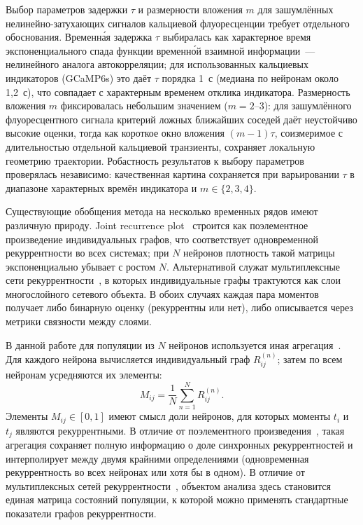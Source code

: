 Выбор параметров задержки $\tau$ и размерности вложения $m$ для зашумлённых нелинейно-затухающих сигналов кальциевой флуоресценции требует отдельного обоснования. Временна́я задержка $\tau$ выбиралась как характерное время экспоненциального спада функции временно́й взаимной информации~--- нелинейного аналога автокорреляции; для использованных кальциевых индикаторов (GCaMP6s) это даёт $\tau$ порядка 1~с (медиана по нейронам около 1,2~с), что совпадает с характерным временем отклика индикатора. Размерность вложения $m$ фиксировалась небольшим значением ($m = 2$--$3$): для зашумлённого флуоресцентного сигнала критерий ложных ближайших соседей даёт неустойчиво высокие оценки, тогда как короткое окно вложения $(m-1)\tau$, соизмеримое с длительностью отдельной кальциевой транзиенты, сохраняет локальную геометрию траектории. Робастность результатов к выбору параметров проверялась независимо: качественная картина сохраняется при варьировании $\tau$ в диапазоне характерных времён индикатора и $m \in \{2, 3, 4\}$.

Существующие обобщения метода на несколько временных рядов имеют различную природу. Joint recurrence plot~\cite{Romano2004} строится как поэлементное произведение индивидуальных графов, что соответствует одновременной рекуррентности во всех системах; при $N$ нейронов плотность такой матрицы экспоненциально убывает с ростом $N$. Альтернативой служат мультиплексные сети рекуррентности~\cite{Eroglu2018}, в которых индивидуальные графы трактуются как слои многослойного сетевого объекта. В обоих случаях каждая пара моментов получает либо бинарную оценку (рекуррентны или нет), либо описывается через метрики связности между слоями.

В данной работе для популяции из $N$ нейронов используется иная агрегация~\cite{Pospelov2024cns}. Для каждого нейрона вычисляется индивидуальный граф $R^{(n)}_{ij}$; затем по всем нейронам усредняются их элементы:
\begin{equation}
M_{ij} = \frac{1}{N}\sum_{n=1}^{N} R^{(n)}_{ij}.
\end{equation}
Элементы $M_{ij} \in [0, 1]$ имеют смысл доли нейронов, для которых моменты $t_i$ и $t_j$ являются рекуррентными. В отличие от поэлементного произведения~\cite{Romano2004}, такая агрегация сохраняет полную информацию о доле синхронных рекуррентностей и интерполирует между двумя крайними определениями (одновременная рекуррентность во всех нейронах или хотя бы в одном). В отличие от мультиплексных сетей рекуррентности~\cite{Eroglu2018}, объектом анализа здесь становится единая матрица состояний популяции, к которой можно применять стандартные показатели графов рекуррентности.

